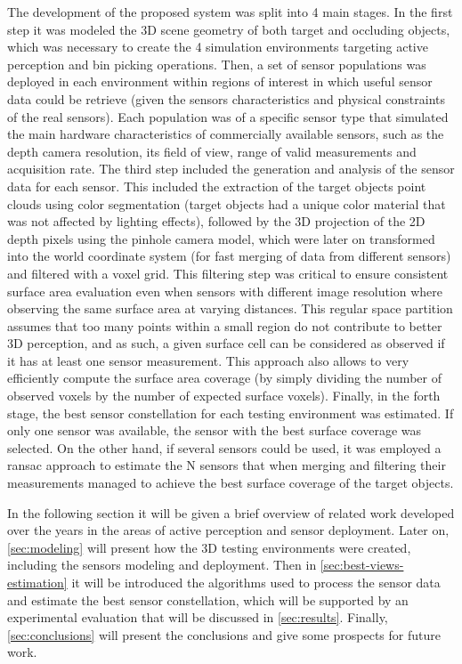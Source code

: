 The development of the proposed system was split into 4 main stages. In the first step it was modeled the 3D scene geometry of both target and occluding objects, which was necessary to create the 4 simulation environments targeting active perception and bin picking operations. Then, a set of sensor populations was deployed in each environment within regions of interest in which useful sensor data could be retrieve (given the sensors characteristics and physical constraints of the real sensors). Each population was of a specific sensor type that simulated the main hardware characteristics of commercially available sensors, such as the depth camera resolution, its field of view, range of valid measurements and acquisition rate. The third step included the generation and analysis of the sensor data for each sensor. This included the extraction of the target objects point clouds using color segmentation (target objects had a unique color material that was not affected by lighting effects), followed by the 3D projection of the 2D depth pixels using the pinhole camera model, which were later on transformed into the world coordinate system (for fast merging of data from different sensors) and filtered with a voxel grid. This filtering step was critical to ensure consistent surface area evaluation even when sensors with different image resolution where observing the same surface area at varying distances. This regular space partition assumes that too many points within a small region do not contribute to better 3D perception, and as such, a given surface cell can be considered as observed if it has at least one sensor measurement. This approach also allows to very efficiently compute the surface area coverage (by simply dividing the number of observed voxels by the number of expected surface voxels). Finally, in the forth stage, the best sensor constellation for each testing environment was estimated. If only one sensor was available, the sensor with the best surface coverage was selected. On the other hand, if several sensors could be used, it was employed a \gls{ransac} approach to estimate the N sensors that when merging and filtering their measurements managed to achieve the best surface coverage of the target objects.

In the following section it will be given a brief overview of related work developed over the years in the areas of active perception and sensor deployment. Later on, \cref{sec:modeling} will present how the 3D testing environments were created, including the sensors modeling and deployment. Then in \cref{sec:best-views-estimation} it will be introduced the algorithms used to process the sensor data and estimate the best sensor constellation, which will be supported by an experimental evaluation that will be discussed in \cref{sec:results}. Finally, \cref{sec:conclusions} will present the conclusions and give some prospects for future work.
